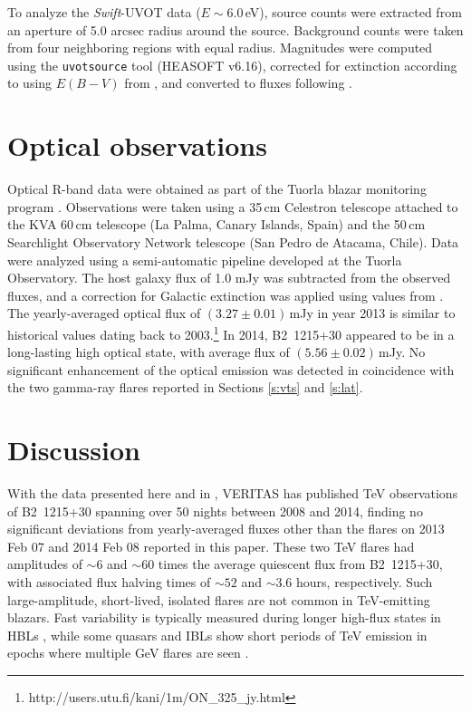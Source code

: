 \documentclass[twocolumn]{aastex6}
\def\b2{B2~1215+30}
\begin{document}
To analyze the {\it Swift}-UVOT data ($E\sim6.0$\,eV), source counts were extracted from an aperture
of 5.0 arcsec radius around the source. Background counts were
taken from four neighboring regions with equal radius.
Magnitudes were  computed using the
{\tt{uvotsource}} tool (HEASOFT v6.16), 
corrected for extinction according to \citet{2009ApJ...690..163R} 
using $E(B-V)$ from \citet{2011ApJ...737..103S}, and converted to fluxes following 
\citet{2008MNRAS.383..627P}.

\section{Optical observations}
Optical R-band data were obtained as part of the Tuorla blazar monitoring program \citep[http://users.utu.fi/kani/1m, ][]{takalo}. Observations were taken using a 35\,cm Celestron telescope attached to the KVA 60\,cm telescope (La Palma, Canary Islands, Spain) and the 50\,cm Searchlight Observatory Network telescope (San Pedro de Atacama, Chile). Data were analyzed using a semi-automatic pipeline developed at the Tuorla Observatory. 
The host galaxy flux of 1.0 mJy \citep{nilsson} was subtracted from the observed fluxes, and a correction for Galactic extinction was applied using values from \citet{2011ApJ...737..103S}.
The yearly-averaged optical flux of $\left(3.27 \pm 0.01\right)$\,mJy in year 2013 is similar to historical values dating back to 2003.\footnote{http://users.utu.fi/kani/1m/ON\_325\_jy.html} In 2014, \b2 appeared to be in a long-lasting high optical state, with average flux of $\left(5.56 \pm 0.02\right)$\,mJy.
No significant enhancement of the optical emission was detected in coincidence with the two gamma-ray flares reported in Sections \ref{s:vts} and \ref{s:lat}. 

\section{Discussion} 
\label{discussion}
With the data presented here and in \citet{veritas_1215}, VERITAS has published TeV observations of \b2 spanning over 50 nights between 2008 and 2014, finding no significant deviations from yearly-averaged fluxes other than the flares on 2013 Feb 07 and 2014 Feb 08 reported in this paper. 
These two TeV flares had amplitudes of $\sim 6$ and $\sim 60$ times the average quiescent flux from \b2, with associated
flux halving times of $\sim 52$ and $\sim 3.6$ hours, respectively.
Such large-amplitude, short-lived, isolated flares are not common in TeV-emitting blazars. Fast variability is typically measured during longer high-flux states in HBLs \citep[see, e.g.,][]{1959,501}, %
while some quasars and IBLs show short periods of TeV emission in epochs where multiple GeV flares are seen \citep{magic_1222,veritas-BLLac}. 
\end{document}
